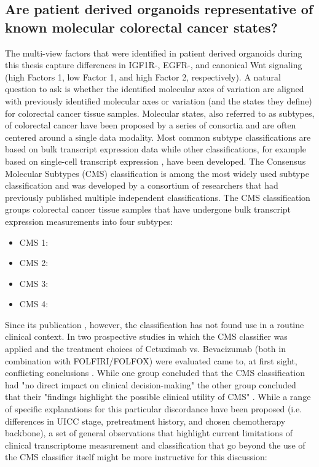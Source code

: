 \begin{flushleft}
\subsection{Are patient derived organoids representative of known molecular colorectal cancer states?}

The multi-view factors that were identified in patient derived organoids during this thesis capture differences in IGF1R-, EGFR-, and canonical Wnt signaling (high Factors 1, low Factor 1, and high Factor 2, respectively). A natural question to ask is whether the identified molecular axes of variation are aligned with previously identified molecular axes or variation (and the states they define) for colorectal cancer tissue samples. Molecular states, also referred to as subtypes, of colorectal cancer have been proposed by a series of consortia and are often centered around a single data modality. Most common subtype classifications are based on bulk transcript expression data \citep{} while other classifications, for example based on single-cell transcript expression \citep{joanitoSinglecellBulkTranscriptome2022}, have been developed. The Consensus Molecular Subtypes (CMS) classification \citep{} is among the most widely used subtype classification and was developed by a consortium of researchers that had previously published multiple independent classifications. The CMS classification groups colorectal cancer tissue samples that have undergone bulk transcript expression measurements into four subtypes:

\begin{itemize} 
    \item CMS 1: 
    \item CMS 2: 
    \item CMS 3: 
    \item CMS 4: 
\end{itemize}

Since its publication \citep{}, however, the classification has not found use in a routine clinical context. In two prospective studies in which the CMS classifier was applied and the treatment choices of Cetuximab vs. Bevacizumab (both in combination with FOLFIRI/FOLFOX) were evaluated came to, at first sight, conflicting conclusions \citep{stintzingConsensusMolecularSubgroups2019, lenzImpactConsensusMolecular2019, aderkaExplainingUnexplainableDiscrepancies2019, sveenPredictiveModelingColorectal2019}. While one group concluded that the CMS classification had "no direct impact on clinical decision-making" \citep{stintzingConsensusMolecularSubgroups2019,} the other group concluded that their "findings highlight the possible clinical utility of CMS" \citep{lenzImpactConsensusMolecular2019}. While a range of specific explanations for this particular discordance have been proposed (i.e. differences in UICC stage, pretreatment history, and chosen chemotherapy backbone), a set of general observations that highlight current limitations of clinical transcriptome measurement and classification that go beyond the use of the CMS classifier itself might be more instructive for this discussion: 


\end{flushleft}
